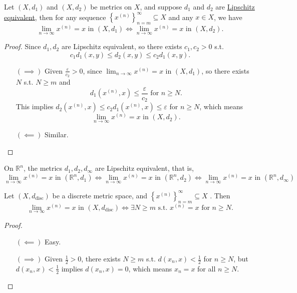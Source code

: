 \begin{theorem}\label{thm: Lipschitz eq implies converge at same place}
    Let \((X, d_1)\) and \((X, d_2)\) be metrics on \(X\), and suppose \(d_1\) and \(d_2\) are \hyperref[def: Lipschitz equivalent metric]{Lipschitz equivalent}, then for any sequence \(\left\{ x^{(n)} \right\}_{n=m}^{\infty} \subseteq X \) and any \(x \in X\), we have
    \[
        \lim_{n \to \infty} x^{(n)} = x \text{ in } (X, d_1) \iff \lim_{n \to \infty} x^{(n)} = x \text{ in } (X, d_2). 
    \]        
\end{theorem}
\begin{proof}
    Since \(d_1, d_2\) are Lipschitz equivalent, so there exists \(c_1, c_2 > 0\) s.t. 
    \[
        c_1 d_1(x,y) \le d_2(x, y) \le c_2 d_1(x, y).
    \]  
    \begin{itemize}
        \item [\((\implies )\)] Given \(\frac{\varepsilon}{c_2} > 0\), since \(\lim_{n \to \infty} x^{(n)} = x \) in \((X, d_1)\), so there exists \(N\) s.t. \(N \ge m\) and 
        \[
            d_1(x^{(n)}, x) \le \frac{\varepsilon}{c_2} \text{ for } n \ge N.
        \]
        This implies \(d_2(x^{(n)}, x) \le c_2 d_1(x^{(n)},x) \le \varepsilon \) for \(n \ge N\), which means 
        \[
            \lim_{n \to \infty} x^{(n)} = x \text{ in } (X,d_2). 
        \]  
        \item [\((\impliedby )\) ] Similar.
    \end{itemize}
\end{proof}

\begin{remark}
    On \(\mathbb{R} ^n\), the metrics \(d_1, d_2, d_\infty \) are Lipschitz equivalent, that is, 
    \[
        \lim_{n \to \infty} x^{(n)} = x \text{ in } (\mathbb{R}^n, d_1) \iff \lim_{n \to \infty} x^{(n)} = x \text{ in } (\mathbb{R}^n, d_2) \iff \lim_{n \to \infty} x^{(n)} = x \text{ in } (\mathbb{R}^n, d_\infty )  
    \]   
\end{remark}

\begin{proposition}
    Let \((X, d_{\text{disc}})\) be a discrete metric space, and \(\left\{ x^{(n)} \right\}_{n=m}^{\infty} \subseteq X \) . Then 
    \[
        \lim_{n \to \infty} x^{(n)} = x \text{ in } (X, d_{\text{disc}}) \iff \exists N \ge m \text{ s.t. } x^{(n)}=x \text{ for } n \ge N. 
    \] 
\end{proposition}
\begin{proof}
    \begin{itemize}
        \item [\((\impliedby )\) ] Easy. 
        \item [\((\implies )\) ] Given \(\frac{1}{2} > 0\), there exists \(N \ge m\) s.t. \(d(x_n, x) < \frac{1}{2}\) for \(n \ge N\), but \(d(x_n, x) < \frac{1}{2}\) implies \(d(x_n, x) = 0\), which means \(x_n = x\) for all \(n \ge N\).       
    \end{itemize}
\end{proof}

